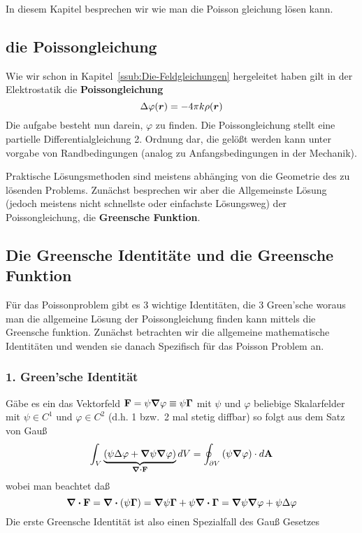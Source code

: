 In diesem Kapitel besprechen wir wie man die Poisson gleichung lösen kann.

\subsection{die Poissongleichung}%
\label{ssub:poissongleichung}

Wie wir schon in Kapitel~\ref{ssub:Die-Feldgleichungen} hergeleitet haben
gilt in der Elektrostatik die \textbf{Poissongleichung}
\begin{equation*}
  \Delta \varphi (\vb*r) = -4\pi k \rho(\vb*r)
\end{equation*}
Die aufgabe besteht nun darein, $\varphi$ zu finden. Die Poissongleichung 
stellt eine partielle Differentialgleichung 2. Ordnung dar, die gelößt
werden kann unter vorgabe von Randbedingungen (analog zu Anfangsbedingungen
in der Mechanik). 

Praktische Lösungsmethoden sind meistens abhänging von die Geometrie
des zu lösenden Problems. Zunächst besprechen wir aber die Allgemeinste 
Lösung (jedoch meistens nicht schnellste oder einfachste Lösungsweg) der
Poissongleichung, die \textbf{Greensche Funktion}.

\subsection{Die Greensche Identitäte und die Greensche Funktion}%
\label{sub:green}

Für das Poissonproblem gibt es 3 wichtige Identitäten, die 3 Green'sche 
woraus man die allgemeine Lösung der Poissongleichung finden kann 
mittels die Greensche funktion. Zunächst betrachten wir die allgemeine
mathematische Identitäten und wenden sie danach Spezifisch für das Poisson
Problem an.

\subsubsection{1. Green'sche Identität}%
\label{ssub:green-id-1}
Gäbe es ein das Vektorfeld $\vb F = \psi \grad \varphi \equiv \psi \vb \Gamma$ 
mit $\psi$ und $\varphi$ beliebige Skalarfelder mit $\psi\in C^1$ und
$\varphi\in C^2$ (d.h. 1 bzw.\ 2 mal stetig diffbar) so folgt aus dem 
Satz von Gauß
\begin{equation}
  \int_V \underbrace{\qty(\psi\Delta\varphi + 
  \grad\psi\grad\varphi)}_{\div\vb F}dV =
  \oint_{\partial V} \qty(\psi\grad\varphi) \cdot d\vb A
\end{equation}
wobei man beachtet daß
\begin{equation*}
  \div \vb F =\div (\psi \vb \Gamma) = 
  \grad \psi \vb \Gamma + \psi\div\vb \Gamma = \grad \psi \grad \varphi + 
  \psi \Delta \varphi
\end{equation*}
Die erste Greensche Identität ist also einen Spezialfall des Gauß Gesetzes


